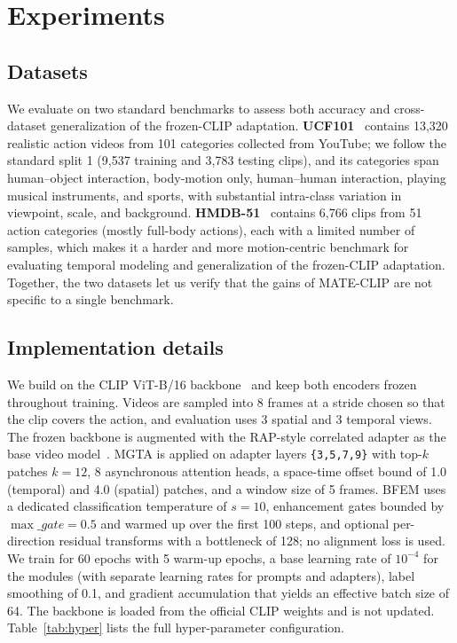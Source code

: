 
\section{Experiments}
\label{sec:experiments}

\subsection{Datasets}
\label{sec:datasets}
We evaluate on two standard benchmarks to assess both accuracy and cross-dataset generalization of the frozen-CLIP adaptation.
\textbf{UCF101}~\cite{soomro2012ucf101} contains 13,320 realistic action videos from 101 categories collected from YouTube; we follow the standard split 1 (9,537 training and 3,783 testing clips), and its categories span human--object interaction, body-motion only, human--human interaction, playing musical instruments, and sports, with substantial intra-class variation in viewpoint, scale, and background.
\textbf{HMDB-51}~\cite{kuehne2011hmdb} contains 6,766 clips from 51 action categories (mostly full-body actions), each with a limited number of samples, which makes it a harder and more motion-centric benchmark for evaluating temporal modeling and generalization of the frozen-CLIP adaptation.
Together, the two datasets let us verify that the gains of MATE-CLIP are not specific to a single benchmark.

\subsection{Implementation details}
\label{sec:implementation}
We build on the CLIP ViT-B/16 backbone~\cite{radford2021clip} and keep both encoders frozen throughout training.
Videos are sampled into 8 frames at a stride chosen so that the clip covers the action, and evaluation uses 3 spatial and 3 temporal views.
The frozen backbone is augmented with the RAP-style correlated adapter as the base video model~\cite{cao2024rap}. MGTA is applied on adapter layers \texttt{\{3,5,7,9\}} with top-$k$ patches $k=12$, 8 asynchronous attention heads, a space-time offset bound of 1.0 (temporal) and 4.0 (spatial) patches, and a window size of 5 frames.
BFEM uses a dedicated classification temperature of $s = 10$, enhancement gates bounded by $\max\_gate = 0.5$ and warmed up over the first 100 steps, and optional per-direction residual transforms with a bottleneck of 128; no alignment loss is used.
We train for 60 epochs with 5 warm-up epochs, a base learning rate of $10^{-4}$ for the modules (with separate learning rates for prompts and adapters), label smoothing of 0.1, and gradient accumulation that yields an effective batch size of 64.
The backbone is loaded from the official CLIP weights and is not updated.
Table~\ref{tab:hyper} lists the full hyper-parameter configuration.

